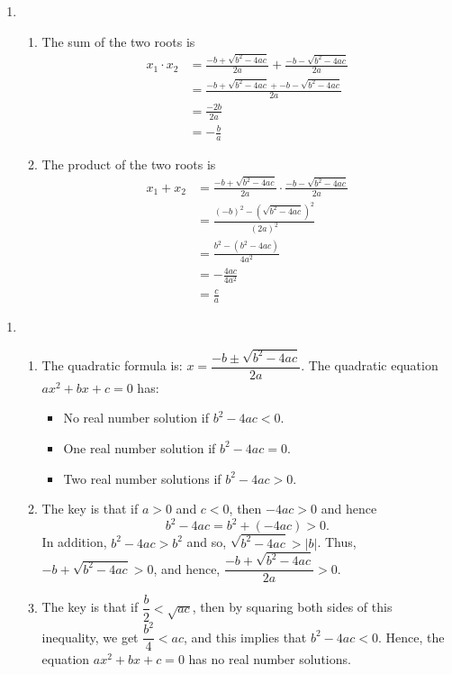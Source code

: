 \begin{enumerate}
\item \begin{enumerate} 
\item The sum of the two roots is
\begin{align*}
x_1 \cdot x_2 &= \frac{-b + \sqrt{b^2 - 4ac}}{2a} + \frac{-b - \sqrt{b^2 - 4ac}}{2a} \\
          &= \frac{-b + \sqrt{b^2 - 4ac} + -b - \sqrt{b^2 - 4ac}}{2a} \\
          &= \frac{-2b}{2a} \\
          &= - \frac{b}{a}
\end{align*}

\item The product of the two roots is
\begin{align*}
x_1 + x_2 &= \frac{-b + \sqrt{b^2 - 4ac}}{2a} \cdot \frac{-b - \sqrt{b^2 - 4ac}}{2a} \\
          &= \frac{(-b)^2 - \left( \sqrt{b^2 - 4ac} \right)^2}{(2a)^2} \\
          &= \frac{b^2 - \left(b^2 - 4ac \right)}{4a^2} \\
          &= - \frac{4ac}{4a^2} \\
          &= \frac{c}{a}
\end{align*}

\end{enumerate}
\end{enumerate}




\begin{enumerate}
\item \begin{enumerate} 
\item The quadratic formula is:  $x = \dfrac{-b \pm \sqrt{b^2 - 4ac}}{2a}$.  The quadratic equation $ax^2 + bx + c = 0$ has:
\begin{itemize}
\item No real number solution if $b^2 - 4ac < 0$.
\item One real number solution if $b^2 - 4ac = 0$.
\item Two real number solutions if $b^2 - 4ac > 0$.
\end{itemize}

\item The key is that if $a > 0$ and $c < 0$, then $-4ac > 0$ and hence 
\[
b^2 - 4ac = b^2 + \left( -4ac \right) > 0.
\]
In addition, $b^2 - 4ac > b^2$ and so, $\sqrt{b^2 - 4ac} > \left| b \right|$.  Thus, \\
$-b + \sqrt{b^2 - 4ac} > 0$, and hence, $\dfrac{-b + \sqrt{b^2 - 4ac}}{2a} > 0$.

\item The key is that if $\dfrac{b}{2} < \sqrt{ac}$, then by squaring both sides of this inequality, we get $\dfrac{b^2}{4} < ac$, and this implies that $b^2 - 4ac < 0$.  Hence, the equation $ax^2 + bx + c = 0$ has no real number solutions.
\end{enumerate}
\end{enumerate}
\hbreak


